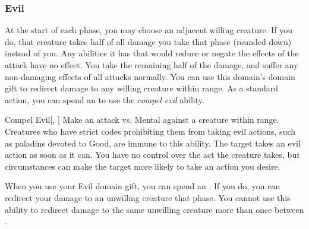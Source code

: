         \subsubsection{Evil}
             At the start of each phase, you may choose an adjacent willing creature.
            If you do, that creature takes half of all damage you take that phase (rounded down) instead of you.
            Any abilities it has that would reduce or negate the effects of the attack have no effect.
            You take the remaining half of the damage, and suffer any non-damaging effects of all attacks normally.
             You can use this domain's domain gift to redirect damage to any willing creature within \rngclose range.
             As a standard action, you can spend an  to use the \textit{compel evil} ability.
            \begin{ability}{Compel Evil}[, ]
                Make an attack vs. Mental against a creature within \rngmed range.
                Creatures who have strict codes prohibiting them from taking evil actions, such as paladins devoted to Good, are immune to this ability.
                \hit The target takes an evil action as soon as it can.
                You have no control over the act the creature takes, but circumstances can make the target more likely to take an action you desire.
            \end{ability}
             When you use your Evil domain gift, you can spend an .
            If you do, you can redirect your damage to an unwilling creature that phase.
            You cannot use this ability to redirect damage to the same unwilling creature more than once between .

